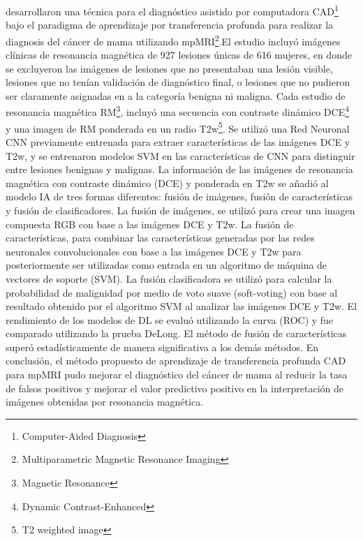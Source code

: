 \citep{Hu2020} desarrollaron una técnica para el diagnóstico asistido por computadora CAD\footnote{Computer-Aided Diagnosis} bajo el paradigma de aprendizaje por transferencia profunda para realizar la diagnosis del cáncer de mama utilizando mpMRI\footnote{Multiparametric Magnetic Resonance Imaging}.El estudio incluyó imágenes clínicas de resonancia magnética de 927 lesiones únicas de 616 mujeres, en donde se excluyeron las imágenes de lesiones que no presentaban una lesión visible, lesiones que no tenían validación de diagnóstico final, o lesiones que no pudieron ser claramente asignadas en a la categoría benigna ni maligna. Cada estudio de resonancia magnética RM\footnote{Magnetic Resonance}, incluyó una secuencia con contraste dinámico DCE\footnote{Dynamic Contrast-Enhanced} y una imagen de RM ponderada en un radio T2w\footnote{T2 weighted image}. Se utilizó una Red Neuronal CNN previamente entrenada para extraer características de las imágenes DCE y T2w, y se entrenaron modelos SVM en las características de CNN para distinguir entre lesiones benignas y malignas. La información de las imágenes de resonancia magnética con contraste dinámico (DCE) y ponderada en T2w se añadió al modelo IA de tres formas diferentes: fusión de imágenes, fusión de características y fusión de clasificadores. La fusión de imágenes, se utilizó para crear una imagen compuesta RGB con base a las imágenes DCE y T2w. La fusión de características, para combinar las características generadas por las redes neuronales convolucionales con base a las imágenes DCE y T2w para posteriormente ser utilizadas como entrada en un algoritmo de máquina de vectores de soporte (SVM). La fusión clasificadora se utilizó para calcular la probabilidad de malignidad por medio de voto suave (soft-voting) con base al resultado obtenido por el algoritmo SVM al analizar las imágenes DCE y T2w. El rendimiento de los modelos de DL se evaluó utilizando la curva (ROC) y fue comparado utilizando la prueba DeLong. El método de fusión de características superó estadísticamente de manera significativa a los demás métodos. En conclusión, el método propuesto de aprendizaje de transferencia profunda CAD para mpMRI pudo mejorar el diagnóstico del cáncer de mama al reducir la tasa de falsos positivos y mejorar el valor predictivo positivo en la interpretación de imágenes obtenidas por resonancia magnética.

